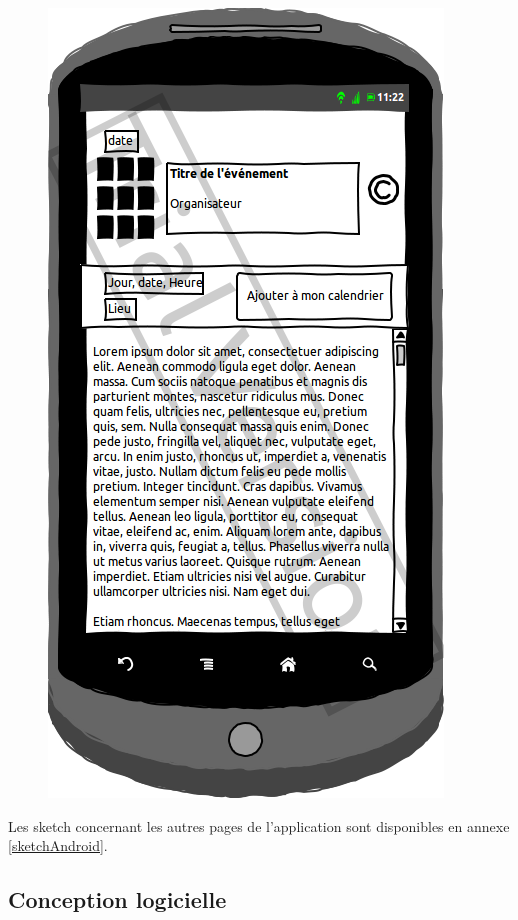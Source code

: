 \documentclass[a4paper, 11px]{article}
\begin{document}
\begin{figure}[htbp]
\begin{minipage}[c]{.50\linewidth}
\begin{center}
			\includegraphics[scale=0.3]{../../Sketch/Android/DescrEvent.png}
		\end{center}
	\end{minipage}
\end{figure}
Les sketch concernant les autres pages de l'application sont disponibles en annexe \ref{sketchAndroid}.
\vfill
\clearpage





\subsection{Conception logicielle}
\end{document}
